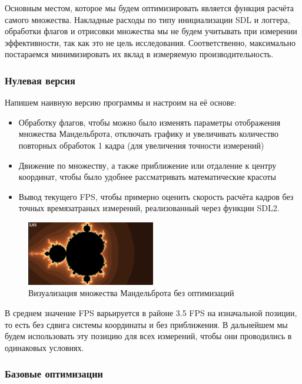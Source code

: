 \documentclass[12pt,a4paper]{article}
\begin{document}
Основным местом, которое мы будем оптимизировать является функция расчёта самого множества. Накладные расходы по типу инициализации SDL и логгера, обработки флагов и отрисовки множества мы не будем учитывать при измерении эффективности, так как это не цель исследования. Соответственно, максимально постараемся минимизировать их вклад в измеряемую производительность.


\subsubsection{Нулевая версия} 

Напишем наивную версию программы и настроим на её основе:
\begin{itemize}
    \item Обработку флагов, чтобы можно было изменять параметры отображения множества Мандельброта, отключать графику и увеличивать количество повторных обработок 1 кадра (для увеличения точности измерений)
    \item Движение по множеству, а также приближение или отдаление к центру координат, чтобы было удобнее рассматривать математические красоты
    \item Вывод текущего FPS, чтобы примерно оценить скорость расчёта кадров без точных времязатраных измерений, реализованный через функции SDL2.
\end{itemize}

\begin{figure}[ht!]
    \centering
    \includegraphics[width=0.5\textwidth]{mand_O0.png}
    \caption{Визуализация множества Мандельброта без оптимизаций}
    \label{fig:mand_O0}
\end{figure}

В среднем значение FPS варьируется в районе 3.5 FPS на изначальной позиции, то есть без сдвига системы координаты и без приближения. В дальнейшем мы будем использовать эту позицию для всех измерений, чтобы они проводились в одинаковых условиях.

\subsubsection{Базовые оптимизации} 
\end{document}
